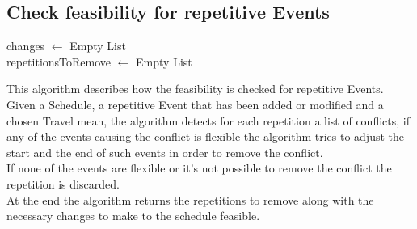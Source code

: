 \subsection{Check feasibility for repetitive Events}

\begin{algorithm}[H]
	
	\bigskip
	changes $\gets$ Empty List\\
	repetitionsToRemove $\gets$ Empty List\\
	{
	}
\end{algorithm}

\bigskip
\noindent
This algorithm describes how the feasibility is checked for repetitive Events.
Given a  Schedule, a repetitive Event that has been added or modified and a chosen Travel mean,  the algorithm detects for each repetition a list of conflicts, if any of the events causing the conflict is flexible the algorithm tries to adjust the start and the end of such events in order to remove the conflict.\\
If none of the events are flexible or it's not possible to remove the conflict the repetition is discarded.\\
At the end the algorithm returns the repetitions to remove along with the necessary changes to make to the schedule feasible.

